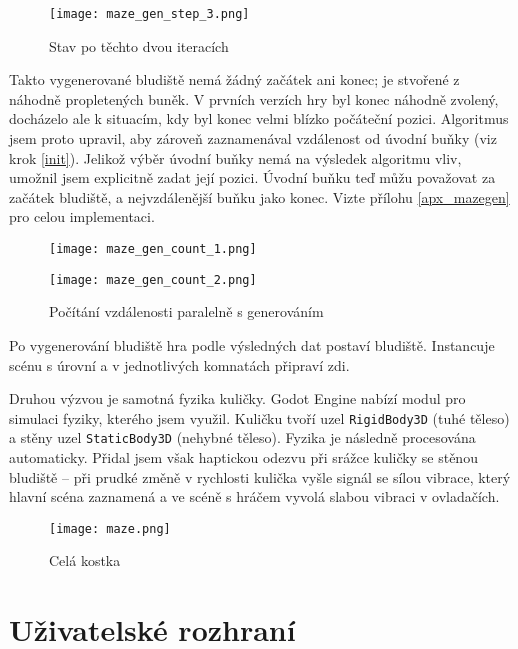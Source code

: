 \begin{figure}[H]
  \centering
  \texttt{[image: maze\_gen\_step\_3.png]}
  \caption{Stav po těchto dvou iteracích}
\end{figure}

Takto vygenerované bludiště nemá žádný začátek ani konec; je stvořené z náhodně propletených buněk. V prvních verzích hry byl konec náhodně zvolený, docházelo ale k situacím, kdy byl konec velmi blízko počáteční pozici. Algoritmus jsem proto upravil, aby zároveň zaznamenával vzdálenost od úvodní buňky (viz krok \ref{init}). Jelikož výběr úvodní buňky nemá na výsledek algoritmu vliv, umožnil jsem explicitně zadat její pozici. Úvodní buňku teď můžu považovat za začátek bludiště, a nejvzdálenější buňku jako konec. Vizte přílohu \ref{apx_mazegen} pro celou implementaci.

\begin{figure}[H]
  \centering

  \begin{minipage}{.5\textwidth}
    \centering
    \texttt{[image: maze\_gen\_count\_1.png]}
  \end{minipage}%
  \begin{minipage}{.5\textwidth}
    \centering
    \texttt{[image: maze\_gen\_count\_2.png]}
  \end{minipage}

  \caption{Počítání vzdálenosti paralelně s generováním}
\end{figure}

Po vygenerování bludiště hra podle výsledných dat postaví bludiště. Instancuje scénu s úrovní a v jednotlivých komnatách připraví zdi.

Druhou výzvou je samotná fyzika kuličky. Godot Engine nabízí modul pro simulaci fyziky, kterého jsem využil. Kuličku tvoří uzel \texttt{RigidBody3D} (tuhé těleso) a stěny uzel \texttt{StaticBody3D} (nehybné těleso). Fyzika je následně procesována automaticky. Přidal jsem však haptickou odezvu při srážce kuličky se stěnou bludiště -- při prudké změně v rychlosti kulička vyšle signál se sílou vibrace, který hlavní scéna zaznamená a ve scéně s hráčem vyvolá slabou vibraci v ovladačích.

\begin{figure}[H]
  \centering
  \texttt{[image: maze.png]}
  \caption{Celá kostka}
  \label{maze_fig}
\end{figure}

\label{uzivatelske_rozhrani}
\section{Uživatelské rozhraní}

